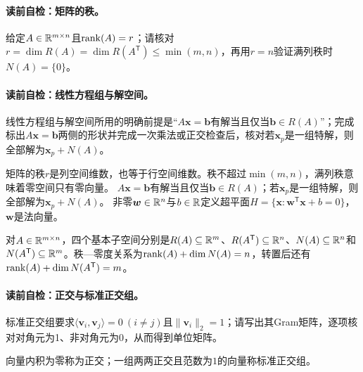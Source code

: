 \paragraph{读前自检：矩阵的秩。}给定$A\in\mathbb{R}^{m\times n}$且$\operatorname{rank}(A)=r$；请核对$r=\dim R(A)=\dim R(A^{\mathsf T})\le\min(m,n)$，再用$r=n$验证满列秩时$N(A)=\{0\}$。\par
\paragraph{读前自检：线性方程组与解空间。}线性方程组与解空间所用的明确前提是“$A\boldsymbol{x}=\boldsymbol{b}$有解当且仅当$\boldsymbol{b}\in R(A)$”；完成标出$A\boldsymbol{x}=\boldsymbol{b}$两侧的形状并完成一次乘法或正交检查后，核对若$\boldsymbol{x}_p$是一组特解，则全部解为$\boldsymbol{x}_p+N(A)$。\par

矩阵的秩$r$是列空间维数，也等于行空间维数。秩不超过$\min(m,n)$，满列秩意味着零空间只有零向量。
$A\boldsymbol{x}=\boldsymbol{b}$有解当且仅当$\boldsymbol{b}\in R(A)$；若$\boldsymbol{x}_p$是一组特解，则全部解为$\boldsymbol{x}_p+N(A)$。
非零$\boldsymbol{w}\in\mathbb{R}^n$与$b\in\mathbb{R}$定义超平面$H=\{\boldsymbol{x}:\boldsymbol{w}^{\mathsf T}\boldsymbol{x}+b=0\}$，$\boldsymbol{w}$是法向量。

对$A\in\mathbb{R}^{m\times n}$，四个基本子空间分别是$R(A)\subseteq\mathbb{R}^m$、$R(A^{\mathsf T})\subseteq\mathbb{R}^n$、$N(A)\subseteq\mathbb{R}^n$和$N(A^{\mathsf T})\subseteq\mathbb{R}^m$。秩—零度关系为$\operatorname{rank}(A)+\dim N(A)=n$，转置后还有$\operatorname{rank}(A)+\dim N(A^{\mathsf T})=m$。


\paragraph{读前自检：正交与标准正交组。}标准正交组要求$\langle\boldsymbol v_i,\boldsymbol v_j\rangle=0\ (i\ne j)$且$\lVert\boldsymbol v_i\rVert_2=1$；请写出其Gram矩阵，逐项核对对角元为1、非对角元为0，从而得到单位矩阵。\par

向量内积为零称为正交；一组两两正交且范数为$1$的向量称标准正交组。

